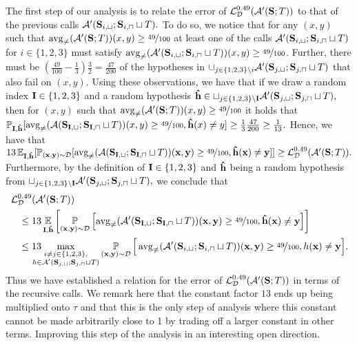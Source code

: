 The first step of our analysis is to relate the error of $ \operatorname{\mathcal{L}}_{\mathcal{D}}^{0.49}(\mathcal{A}'(\mathbf{S};T)) $ to that of the previous calls $ \mathcal{A}'(\mathbf{S}_{i,\sqcup};\mathbf{S}_{i,\sqcap}\sqcup T). $ 
To do so, we notice that for any $ (x,y) $ such that $ \operatorname{\mathrm{avg}_{\not=}}(\mathcal{A}'(\mathbf{S};T))(x,y)\geq \nicefrac{49}{100}$ at least one of the calls $ \mathcal{A}'(\mathbf{S}_{i,\sqcup};\mathbf{S}_{i,\sqcap}\sqcup T) $ for $ i\in\{ 1,2,3 \}  $ must satisfy $ \operatorname{\mathrm{avg}_{\not=}}(\mathcal{A}'(\mathbf{S}_{i,\sqcup};\mathbf{S}_{i,\sqcap}\sqcup T))(x,y)\geq \nicefrac{49}{100} $. Further, there must be $ (\frac{49}{100}-\frac{1}{3})\frac{3}{2} =\frac{47}{200}$ of the hypotheses in $ \cup_{j\in\{  1,2,3\}\backslash i } \mathcal{A}'(\mathbf{S}_{j,\sqcup};\mathbf{S}_{j,\sqcap}\sqcup T)$ that also fail on $ (x,y).$
Using these observations, we have that if we draw a random index $ \mathbf{I}\in\{  1,2,3\}  $ and a random hypothesis $ \mathbf{\hat{h}} \in \sqcup_{j\in\{  1,2,3\}\backslash \mathbf{I} } \mathcal{A}'(\mathbf{S}_{j,\sqcup};\mathbf{S}_{j,\sqcap}\sqcup T),$ then for $(x,y) $ such that  $   \operatorname{\mathrm{avg}_{\not=}}(\mathcal{A}'(\mathbf{S};T))(x,y)\geq \nicefrac{49}{100}  $  it holds that $ \operatorname*{\mathbb{P}}_{\mathbf{I},\mathbf{\hat{h}}}[\operatorname{\mathrm{avg}_{\not=}}(\mathcal{A}(\mathbf{S}_{\mathbf{I},\sqcup};\mathbf{S}_{\mathbf{I},\sqcap}\sqcup T))(x,y)\geq \nicefrac{49}{100},\mathbf{\hat{h}}(x)\not=y]\geq\frac{1}{3}\frac{47}{200}\geq \frac{1}{13}.$  Hence, we have that  $ 13\operatorname*{\mathbb{E}}_{\mathbf{I},\mathbf{\hat{h}}}[\operatorname*{\mathbb{P}}_{(\mathbf{x},\mathbf{y})\sim\mathcal{D}}[\operatorname{\mathrm{avg}_{\not=}}(\mathcal{A}(\mathbf{S}_{\mathbf{I},\sqcup};\mathbf{S}_{\mathbf{I},\sqcap}\sqcup T))(\mathbf{x},\mathbf{y})\geq \nicefrac{49}{100},\mathbf{\hat{h}}(\mathbf{x})\not=\mathbf{y}]]\geq \operatorname{\mathcal{L}}_{\mathcal{D}}^{0.49}(\mathcal{A}'(\mathbf{S};T)).$ 
Furthermore, by the definition of $ \mathbf{I}\in\{  1,2,3\}  $ and $ \mathbf{\hat{h}}$ being a random hypothesis from $ \sqcup_{j\in\{  1,2,3\}\backslash \mathbf{I} } \mathcal{A}'(\mathbf{S}_{j,\sqcup};\mathbf{S}_{j,\sqcap}\sqcup T),$ we conclude that   
\begin{align}
&\operatorname{\mathcal{L}}_{\mathcal{D}}^{0.49}(\mathcal{A}'(\mathbf{S};T)) \notag \\
& \quad \leq 13\operatorname*{\mathbb{E}}_{\mathbf{I},\mathbf{\hat{h}}}\left[\operatorname*{\mathbb{P}}_{(\mathbf{x},\mathbf{y})\sim\mathcal{D}}\left[\operatorname{\mathrm{avg}_{\not=}}(\mathcal{A}'(\mathbf{S}_{\mathbf{I},\sqcup};\mathbf{S}_{\mathbf{I},\sqcap}\sqcup T))(\mathbf{x},\mathbf{y})\geq \nicefrac{49}{100},\mathbf{\hat{h}}(\mathbf{x})\not=\mathbf{y}\right]\right] \nonumber \\
&\quad \leq 13\negmedspace\negmedspace\negmedspace\negmedspace\negmedspace
    \max_{\substack{i \neq j\in\{1,2,3  \}, \\ h\in\mathcal{A}'(\mathbf{S}_{j,\sqcup};\mathbf{S}_{j,\sqcap}\sqcup T)}} \operatorname*{\mathbb{P}}_{(\mathbf{x},\mathbf{y})\sim\mathcal{D}}\Big[\operatorname{\mathrm{avg}_{\not=}}(\mathcal{A}'(\mathbf{S}_{i,\sqcup};\mathbf{S}_{i,\sqcap}\sqcup T))(\mathbf{x},\mathbf{y})\geq \nicefrac{49}{100},h(\mathbf{x})\not=\mathbf{y}\Big]. \label{eq:proofsketch9}
\end{align}
Thus we have established a relation for the error of $ \operatorname{\mathcal{L}}_{\mathcal{D}}^{0.49}(\mathcal{A}'(\mathbf{S};T)) $ in terms of the recursive calls. 
We remark here that the constant factor $ 13 $ ends up being multiplied onto $ \tau $ and that this is the only step of analysis where this constant cannot be made arbitrarily close to 1 by trading off a larger constant in  other terms. Improving this step of the analysis in an interesting open direction.   

